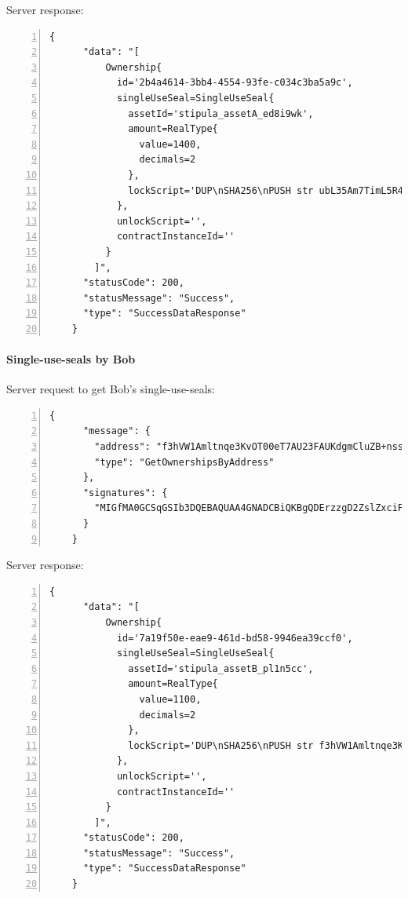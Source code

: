 Server response:
{
  \small
  \begin{Verbatim}[numbers=left,xleftmargin=1cm,firstnumber=1,breaklines=true,breakanywhere=true,tabsize=2]
    {
      "data": "[
          Ownership{
            id='2b4a4614-3bb4-4554-93fe-c034c3ba5a9c', 
            singleUseSeal=SingleUseSeal{
              assetId='stipula_assetA_ed8i9wk', 
              amount=RealType{
                value=1400, 
                decimals=2
              }, 
              lockScript='DUP\nSHA256\nPUSH str ubL35Am7TimL5R4oMwm2OxgAYA3XT3BeeDE56oxqdLc=\nEQUAL\nCHECKSIG\nHALT\n'
            }, 
            unlockScript='', 
            contractInstanceId=''
          }
        ]",
      "statusCode": 200,
      "statusMessage": "Success",
      "type": "SuccessDataResponse"
    }
  \end{Verbatim}
}

\paragraph{Single-use-seals by Bob}

Server request to get Bob's single-use-seals:
{
  \small
  \begin{Verbatim}[numbers=left,xleftmargin=1cm,firstnumber=1,breaklines=true,breakanywhere=true,tabsize=2]
    {
      "message": {
        "address": "f3hVW1Amltnqe3KvOT00eT7AU23FAUKdgmCluZB+nss=",
        "type": "GetOwnershipsByAddress"
      },
      "signatures": {
        "MIGfMA0GCSqGSIb3DQEBAQUAA4GNADCBiQKBgQDErzzgD2ZslZxciFAiX3/ot7lrkZDw4148jFZrsDZPE6CVs9xXFSHGgy/mFvIFLXhnChO6Nyd2be3lbgeavLMCMVUiTStXr117Km17keWpb3sItkKKsLFBOcIIU8XXowI/OhzQN2XPZYESHgjdQ5vwEj2YyueiS7WKP94YWz/pswIDAQAB": "hSNodnUyusffNlv+KNq4605pFvqh91pVspFhTgbmWccE/LKM6h4bedpvTgMHoVDezvA7v2XTzmLG5eL3lOeA6I2xJMH32DcV60IPSoh61oVHnwPQcQHY039D4y5VSJ0GMQJKIcTEq3fqIdabg7261xUaegHUnXrcyynh9GpMJxk="
      }
    }
  \end{Verbatim}
}

Server response:
{
  \small
  \begin{Verbatim}[numbers=left,xleftmargin=1cm,firstnumber=1,breaklines=true,breakanywhere=true,tabsize=2]
    {
      "data": "[
          Ownership{
            id='7a19f50e-eae9-461d-bd58-9946ea39ccf0', 
            singleUseSeal=SingleUseSeal{
              assetId='stipula_assetB_pl1n5cc', 
              amount=RealType{
                value=1100, 
                decimals=2
              }, 
              lockScript='DUP\nSHA256\nPUSH str f3hVW1Amltnqe3KvOT00eT7AU23FAUKdgmCluZB+nss=\nEQUAL\nCHECKSIG\nHALT\n'
            }, 
            unlockScript='', 
            contractInstanceId=''
          }
        ]",
      "statusCode": 200,
      "statusMessage": "Success",
      "type": "SuccessDataResponse"
    }
  \end{Verbatim}
}

